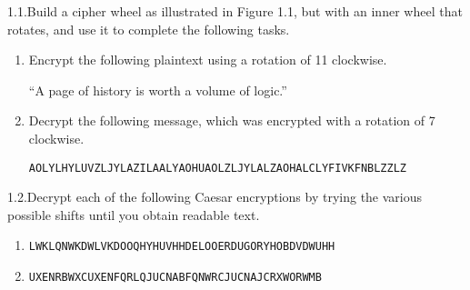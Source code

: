 \begin{exercise}
    {1.1.}Build a cipher wheel as illustrated in Figure 1.1, but with an inner wheel that rotates, and use it to complete the following tasks. 
    \begin{enumerate}
        \item Encrypt the following plaintext using a rotation of 11 clockwise.
        \begin{center}
            ``A page of history is worth a volume of logic.''
        \end{center}
        \item Decrypt the following message, which was encrypted with a rotation of 7 clockwise.
        \begin{center}
            \texttt{AOLYLHYLUVZLJYLAZILAALYAOHUAOLZLJYLALZAOHALCLYFIVKFNBLZZLZ}
        \end{center}
    \end{enumerate}
\end{exercise}


\begin{exercise}
    {1.2.}Decrypt each of the following Caesar encryptions by trying the various possible
shifts until you obtain readable text.
    \begin{enumerate}
        \item \texttt{LWKLQNWKDWLVKDOOQHYHUVHHDELOOERDUGORYHOBDVDWUHH}
        \item \texttt{UXENRBWXCUXENFQRLQJUCNABFQNWRCJUCNAJCRXWORWMB}
    \end{enumerate}
\end{exercise}



